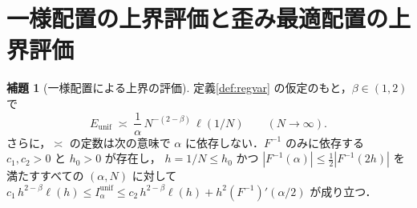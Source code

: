 \documentclass[a4paper,10pt]{jsarticle}
\theoremstyle{definition}
\newtheorem{lemma}{補題}[section]
\newcommand{\Finv}{F^{-1}}
\newcommand{\Eunif}{E_{\mathrm{unif}}}
\newcommand{\Iunif}{I_\alpha^{\mathrm{unif}}}
\begin{document}
\section{一様配置の上界評価と歪み最適配置の上界評価}
\label{sec:eval}

\begin{lemma}[一様配置による上界の評価]
\label{lem:unif}
定義\ref{def:regvar} の仮定のもと，$\beta\in(1,2)$ で
\begin{equation}
  \Eunif\;\asymp\;\frac1\alpha\,N^{-(2-\beta)}\,\ell(1/N)
  \qquad(N\to\infty).
  \label{eq:eunif}
\end{equation}
さらに，$\asymp$ の定数は次の意味で $\alpha$ に依存しない．$\Finv$ のみに依存する $c_1,c_2>0$ と $h_0>0$ が存在し，
$h=1/N\le h_0$ かつ $|\Finv(\alpha)|\le\frac12|\Finv(2h)|$ を満たすすべての $(\alpha,N)$ に対して
$c_1\,h^{2-\beta}\ell(h)\le\Iunif\le c_2\,h^{2-\beta}\ell(h)+h^2(\Finv)'(\alpha/2)$ が成り立つ．
\end{lemma}
\end{document}
